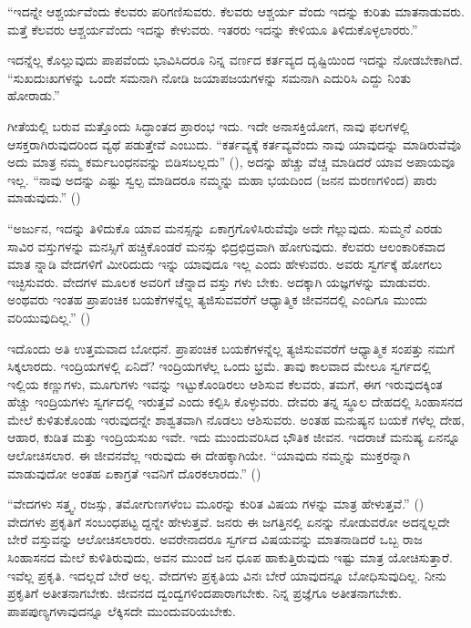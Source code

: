 “ಇದನ್ನೇ ಆಶ್ಚರ್ಯವೆಂದು ಕೆಲವರು ಪರಿಗಣಿಸುವರು. ಕೆಲವರು ಆಶ್ಚರ್ಯ ವೆಂದು ಇದನ್ನು ಕುರಿತು ಮಾತನಾಡುವರು. ಮತ್ತೆ ಕೆಲವರು ಆಶ್ಚರ್ಯವೆಂದು ಇದನ್ನು ಕೇಳುವರು. ಇತರರು ಇದನ್ನು ಕೇಳಿಯೂ ತಿಳಿದುಕೊಳ್ಳಲಾರರು.” 

ಇದನ್ನೆಲ್ಲ ಕೊಲ್ಲುವುದು ಪಾಪವೆಂದು ಭಾವಿಸಿದರೂ ನಿನ್ನ ವರ್ಣದ ಕರ್ತವ್ಯದ ದೃಷ್ಟಿಯಿಂದ ಇದನ್ನು ನೋಡಬೇಕಾಗಿದೆ. “ಸುಖದುಃಖಗಳನ್ನು ಒಂದೇ ಸಮನಾಗಿ ನೋಡಿ ಜಯಾಪಜಯಗಳನ್ನು ಸಮನಾಗಿ ಎದುರಿಸಿ ಎದ್ದು ನಿಂತು ಹೋರಾಡು.” 

ಗೀತೆಯಲ್ಲಿ ಬರುವ ಮತ್ತೊಂದು ಸಿದ್ಧಾಂತದ ಪ್ರಾರಂಭ ಇದು. ಇದೇ ಅನಾಸಕ್ತಿಯೋಗ, ನಾವು ಫಲಗಳಲ್ಲಿ ಆಸಕ್ತರಾಗಿರುವುದರಿಂದ ವ್ಯಥೆ ಪಡುತ್ತೇವೆ ಎಂಬುದು. “ಕರ್ತವ್ಯಕ್ಕೆ ಕರ್ತವ್ಯವೆಂದು ನಾವು ಯಾವುದನ್ನು ಮಾಡಿರುವೆವೊ ಅದು ಮಾತ್ರ ನಮ್ಮ ಕರ್ಮಬಂಧನವನ್ನು ಬಿಡಿಸಬಲ್ಲದು” (), ಅದನ್ನು ಹೆಚ್ಚು ವೆಚ್ಚ ಮಾಡಿದರೆ ಯಾವ ಅಪಾಯವೂ ಇಲ್ಲ. “ನಾವು ಅದನ್ನು ಎಷ್ಟು ಸ್ವಲ್ಪ ಮಾಡಿದರೂ ನಮ್ಮನ್ನು ಮಹಾ ಭಯದಿಂದ (ಜನನ ಮರಣಗಳಿಂದ) ಪಾರು ಮಾಡುವುದು.” ()

“ಅರ್ಜುನ, ಇದನ್ನು ತಿಳಿದುಕೊ ಯಾವ ಮನಸ್ಸನ್ನು ಏಕಾಗ್ರಗೊಳಿಸಿರುವೆವೊ ಅದೇ ಗೆಲ್ಲುವುದು. ಸುಮ್ಮನೆ ಎರಡು ಸಾವಿರ ವಸ್ತುಗಳನ್ನು ಮನಸ್ಸಿಗೆ ಹಚ್ಚಿಕೊಂಡರೆ ಮನಸ್ಸು ಛಿದ್ರಛಿದ್ರವಾಗಿ ಹೋಗುವುದು. ಕೆಲವರು ಆಲಂಕಾರಿಕವಾದ ಮಾತ ನ್ನಾಡಿ ವೇದಗಳಿಗೆ ಮೀರಿದುದು ಇನ್ನು ಯಾವುದೂ ಇಲ್ಲ ಎಂದು ಹೇಳುವರು. ಅವರು ಸ್ವರ್ಗಕ್ಕೆ ಹೋಗಲು ಇಚ್ಛಿಸುವರು. ವೇದಗಳ ಮೂಲಕ ಅವರಿಗೆ ಚೆನ್ನಾದ ವಸ್ತು ಗಳು ಬೇಕು. ಅದಕ್ಕಾಗಿ ಯಜ್ಞಗಳನ್ನು ಮಾಡುವರು. ಅಂಥವರು ಇಂತಹ ಪ್ರಾಪಂಚಿಕ ಬಯಕೆಗಳನ್ನೆಲ್ಲ ತ್ಯಜಿಸುವವರೆಗೆ ಆಧ್ಯಾತ್ಮಿಕ ಜೀವನದಲ್ಲಿ ಎಂದಿಗೂ ಮುಂದು ವರಿಯುವುದಿಲ್ಲ.” ()

ಇದೊಂದು ಅತಿ ಉತ್ತಮವಾದ ಬೋಧನೆ. ಪ್ರಾಪಂಚಿಕ ಬಯಕೆಗಳನ್ನೆಲ್ಲ ತ್ಯಜಿಸುವವರೆಗೆ ಆಧ್ಯಾತ್ಮಿಕ ಸಂಪತ್ತು ನಮಗೆ ಸಿಕ್ಕಲಾರದು. ಇಂದ್ರಿಯಗಳಲ್ಲಿ ಏನಿದೆ? ಇಂದ್ರಿಯಗಳೆಲ್ಲ ಒಂದು ಭ್ರಮೆ. ತಾವು ಕಾಲವಾದ ಮೇಲೂ ಸ್ವರ್ಗದಲ್ಲಿ ಇಲ್ಲಿಯ ಕಣ್ಣುಗಳು, ಮೂಗುಗಳು ಇವನ್ನು ಇಟ್ಟುಕೊಂಡಿರಲು ಆಶಿಸುವ ಕೆಲವರು, ತಮಗೆ, ಈಗ ಇರುವುದಕ್ಕಿಂತ ಹೆಚ್ಚು ಇಂದ್ರಿಯಗಳು ಸ್ವರ್ಗದಲ್ಲಿ ಇರುತ್ತವೆ ಎಂದು ಕಲ್ಪಿಸಿ ಕೊಳ್ಳುವರು. ದೇವರು ತನ್ನ ಸ್ಥೂಲ ದೇಹದಲ್ಲಿ ಸಿಂಹಾಸನದ ಮೇಲೆ ಕುಳಿತುಕೊಂಡು ಇರುವುದನ್ನೇ ಶಾಶ್ವತವಾಗಿ ನೊಡಲು ಆಶಿಸುವರು. ಅಂತಹ ಮನುಷ್ಯನ ಬಯಕೆ ಗಳೆಲ್ಲ ದೇಹ, ಆಹಾರ, ಕುಡಿತ ಮತ್ತು ಇಂದ್ರಿಯಸುಖ ಇವೇ. ಇದು ಮುಂದುವರಿಸಿದ ಭೌತಿಕ ಜೀವನ. ಇದರಾಚೆ ಮನುಷ್ಯ ಏನನ್ನೂ ಆಲೋಚಿಸಲಾರ. ಈ ಜೀವನವೆಲ್ಲ ಇರುವುದು ಈ ದೇಹಕ್ಕಾಗಿಯೇ. “ಯಾವುದು ನಮ್ಮನ್ನು ಮುಕ್ತರನ್ನಾಗಿ ಮಾಡುವುದೋ ಅಂತಹ ಏಕಾಗ್ರತೆ ಇವನಿಗೆ ದೊರಕಲಾರದು.” ()

“ವೇದಗಳು ಸತ್ತ್ವ, ರಜಸ್ಸು, ತಮೋಗುಣಗಳೆಂಬ ಮೂರನ್ನು ಕುರಿತ ವಿಷಯ ಗಳನ್ನು ಮಾತ್ರ ಹೇಳುತ್ತವೆ.” () ವೇದಗಳು ಪ್ರಕೃತಿಗೆ ಸಂಬಂಧಪಟ್ಟ ದ್ದನ್ನೇ ಹೇಳುತ್ತವೆ. ಜನರು ಈ ಜಗತ್ತಿನಲ್ಲಿ ಏನನ್ನು ನೋಡುವರೋ ಅದನ್ನಲ್ಲದೇ ಬೇರೆ ವಸ್ತುವನ್ನು ಆಲೋಚಿಸಲಾರರು. ಅವರೇನಾದರೂ ಸ್ವರ್ಗದ ವಿಷಯವನ್ನು ಮಾತನಾಡಿದರೆ ಒಬ್ಬ ರಾಜ ಸಿಂಹಾಸನದ ಮೇಲೆ ಕುಳಿತಿರುವುದು, ಅವನ ಮುಂದೆ ಜನ ಧೂಪ ಹಾಕುತ್ತಿರುವುದು ಇಷ್ಟು ಮಾತ್ರ ಯೋಚಿಸುತ್ತಾರೆ. ಇವೆಲ್ಲ ಪ್ರಕೃತಿ. ಇದಲ್ಲದೆ ಬೇರೆ ಅಲ್ಲ. ವೇದಗಳು ಪ್ರಕೃತಿಯ ವಿನಃ ಬೇರೆ ಯಾವುದನ್ನೂ ಬೋಧಿಸುವುದಿಲ್ಲ. ನೀನು ಪ್ರಕೃತಿಗೆ ಅತೀತನಾಗಬೇಕು. ಜೀವನದ ದ್ವಂದ್ವಗಳಿಂದಪಾರಾಗಬೇಕು. ನಿನ್ನ ಪ್ರಜ್ಞೆಗೂ ಅತೀತನಾಗಬೇಕು. ಪಾಪಪುಣ್ಯಗಳಾವುದನ್ನೂ ಲೆಕ್ಕಿಸದೇ ಮುಂದುವರಿಯಬೇಕು.

